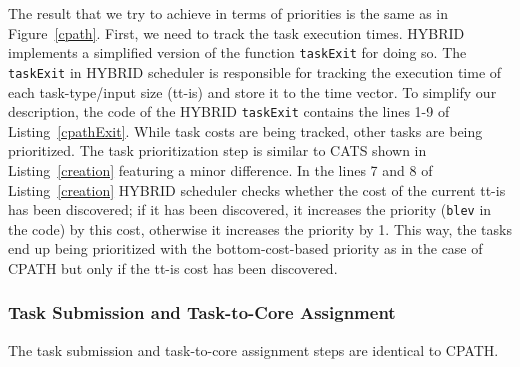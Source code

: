 The result that we try to achieve in terms of priorities is the same as in Figure~\ref{cpath}. 
First, we need to track the task execution times.
HYBRID implements a simplified version of the function \texttt{taskExit} for doing so. 
The \texttt{taskExit} in HYBRID scheduler is responsible for tracking the execution time of each task-type/input size (tt-is) and store it to the time vector.
To simplify our description, the code of the HYBRID \texttt{taskExit} contains the lines 1-9 of Listing~\ref{cpathExit}.
While task costs are being tracked, other tasks are being prioritized.
The task prioritization step is similar to CATS shown in Listing~\ref{creation} featuring a minor difference. 
In the lines 7 and 8 of Listing~\ref{creation} HYBRID scheduler checks whether the cost of the current tt-is has been discovered; if it has been discovered, it increases the priority (\texttt{blev} in the code) by this cost, otherwise it increases the priority by 1.
This way, the tasks end up being prioritized with the bottom-cost-based priority as in the case of CPATH but only if the tt-is cost has been discovered.

\subsubsection{Task Submission and Task-to-Core Assignment}
The task submission and task-to-core assignment steps are identical to CPATH.



